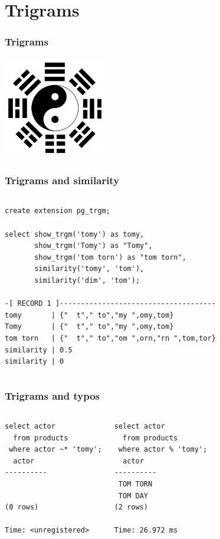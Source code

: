 \documentclass{beamer}
\begin{document}
\section{Trigrams}

\begin{frame}[fragile]
  \frametitle{Trigrams}

\begin{center}
  \includegraphics[height=12em]{trigramme.png}
\end{center}
\end{frame}

\begin{frame}[fragile]
  \frametitle{Trigrams and similarity}

  \vfill

\begin{columns}
\begin{verbatim}
create extension pg_trgm;

select show_trgm('tomy') as tomy,
       show_trgm('Tomy') as "Tomy",
       show_trgm('tom torn') as "tom torn",
       similarity('tomy', 'tom'),
       similarity('dim', 'tom');

-[ RECORD 1 ]-------------------------------------
tomy       | {"  t"," to","my ",omy,tom}
Tomy       | {"  t"," to","my ",omy,tom}
tom torn   | {"  t"," to","om ",orn,"rn ",tom,tor}
similarity | 0.5
similarity | 0
\end{verbatim}  
\end{columns}
\end{frame}

\begin{frame}[fragile]
  \frametitle{Trigrams and typos}

  \vfill

\begin{columns}
\begin{verbatim}
select actor
  from products
 where actor ~* 'tomy';
  actor   
----------


(0 rows)

Time: <unregistered>
\end{verbatim}  
\begin{verbatim}
select actor
  from products
 where actor % 'tomy';
  actor   
----------
 TOM TORN
 TOM DAY
(2 rows)

Time: 26.972 ms
\end{verbatim}  
\end{columns}
\end{frame}
\end{document}
